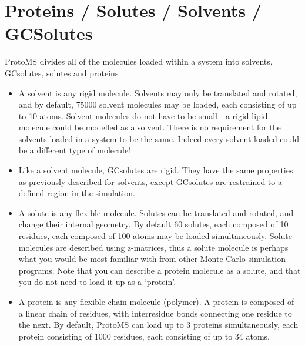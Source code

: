 \documentclass[letterpaper,10pt,english]{sphinxmanual}
\begin{document}
\section{Proteins / Solutes / Solvents / GCSolutes}
\label{\detokenize{protoms:proteins-solutes-solvents-gcsolutes}}
ProtoMS divides all of the molecules loaded within a system into solvents, GCsolutes, solutes and proteins
\begin{itemize}
\item {} 
  A solvent is any rigid molecule. Solvents may only be translated and rotated, and by default, 75000 solvent molecules may be loaded, each consisting of up to 10 atoms. Solvent molecules do not have to be small - a rigid lipid molecule could be modelled as a solvent. There is no requirement for the solvents loaded in a system to be the same. Indeed every solvent loaded could be a different type of molecule!

\item {} 
 Like a solvent molecule, GCsolutes are rigid. They have the same properties as previously described for solvents, except GCsolutes are restrained to a defined region in the simulation.

\item {} 
 A solute is any flexible molecule. Solutes can be translated and rotated, and change their internal geometry. By default 60 solutes, each composed of 10 residues, each composed of 100 atoms may be loaded simultaneously. Solute molecules are described using z-matrices, thus a solute molecule is perhaps what you would be most familiar with from other Monte Carlo simulation programs. Note that you can describe a protein molecule as a solute, and that you do not need to load it up as a ‘protein’.

\item {} 
 A protein is any flexible chain molecule (polymer). A protein is composed of a linear chain of residues, with interresidue bonds connecting one residue to the next. By default, ProtoMS can load up to 3 proteins simultaneously, each protein consisting of 1000 residues, each consisting of up to 34 atoms.

\end{itemize}

\ignorespaces 
{}
\end{document}
